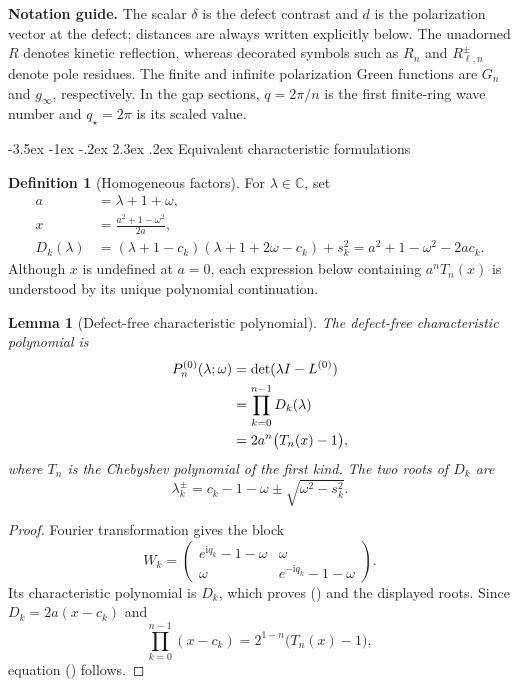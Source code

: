 \documentclass[twoside,10pt]{article}
\makeatletter
\numberwithin{equation}{section}
\theoremstyle{slbody}
\newtheorem{lemma}[theorem]{Lemma}
\theoremstyle{definition}
\newtheorem{definition}[theorem]{Definition}
\theoremstyle{remark}
\newcommand{\C}{\mathbb C}
\newcommand{\ii}{\mathrm i}
\renewcommand{\section}{%
  \@startsection{section}{1}{\z@}%
    {-3.5ex \@plus -1ex \@minus -.2ex}%
    {2.3ex \@plus .2ex}%
    {\normalfont\large\bfseries}}
\renewcommand{\eqref}[1]{%
  \textup{{\normalfont(\oldstylenums{\ref{#1}}}\normalfont)}}
\makeatother
\begin{document}
\medskip
\noindent\textbf{Notation guide.}
The scalar $\delta$ is the defect contrast and $d$ is the polarization
vector at the defect; distances are always written explicitly below.
The unadorned $R$ denotes kinetic reflection, whereas decorated symbols
such as $R_n$ and $R_{\ell,n}^{\pm}$ denote pole residues.  The finite and
infinite polarization Green functions are $G_n$ and $g_\infty$,
respectively.  In the gap sections, $q=2\pi/n$ is the first finite-ring
wave number and $q_\star=2\pi$ is its scaled value.

\section{Equivalent characteristic formulations}\label{sec:characteristic}

\begin{definition}[Homogeneous factors]\label{def:homogeneous-factors}
For $\lambda\in\C$, set
\begin{align}
 a&=\lambda+1+\omega,\label{eq:a-def}\\
 x&=\frac{a^2+1-\omega^2}{2a},\label{eq:x-def}\\
 D_k(\lambda)&=(\lambda+1-c_k)(\lambda+1+2\omega-c_k)+s_k^2
             =a^2+1-\omega^2-2ac_k.\label{eq:Dk}
\end{align}
Although $x$ is undefined at $a=0$, each expression below containing
$a^nT_n(x)$ is understood by its unique polynomial continuation.
\end{definition}

\begin{lemma}[Defect-free characteristic polynomial]
\label{lem:homogeneous-polynomial}
The defect-free characteristic polynomial is
\begin{align}
 P_n^{(0)}(\lambda;\omega)
  &=\det(\lambda I-L^{(0)})\notag\\
  &=\prod_{k=0}^{n-1}D_k(\lambda)\label{eq:P0-product}\\
  &=2a^n\bigl(T_n(x)-1\bigr),\label{eq:P0-cheb}
\end{align}
where $T_n$ is the Chebyshev polynomial of the first kind.
The two roots of $D_k$ are
\[
 \lambda_k^\pm=c_k-1-\omega
       \pm\sqrt{\omega^2-s_k^2}.
\]
\end{lemma}

\begin{proof}
Fourier transformation gives the block
\[
 W_k=\begin{pmatrix}e^{\ii q_k}-1-\omega&\omega\\
                     \omega&e^{-\ii q_k}-1-\omega\end{pmatrix}.
\]
Its characteristic polynomial is $D_k$, which proves
\eqref{eq:P0-product} and the displayed roots.  Since
$D_k=2a(x-c_k)$ and
\[
 \prod_{k=0}^{n-1}(x-c_k)=2^{1-n}\bigl(T_n(x)-1\bigr),
\]
equation \eqref{eq:P0-cheb} follows.
\end{proof}
\end{document}
